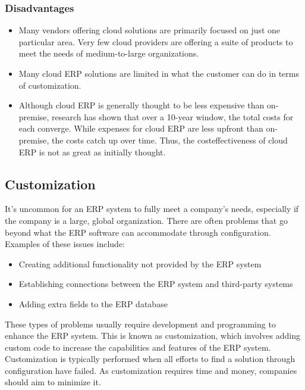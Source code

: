 \subsubsection{Disadvantages}
\begin{itemize}
    \item Many vendors offering cloud solutions are primarily focused on just one particular area. Very few cloud providers are offering a suite of products to meet the needs of medium-to-large organizations.
    \item Many cloud ERP solutions are limited in what the customer can do in terms of customization.
    \item Although cloud ERP is generally thought to be less expensive than on-premise, research has shown that over a 10-year window, the total costs for each converge. While expenses for cloud ERP are less upfront than on-premise, the costs catch up over time. Thus, the costeffectiveness of cloud ERP is not as great as initially thought.
\end{itemize}

\subsection{Customization}
It's uncommon for an ERP system to fully meet a company's needs, especially if the company is a large, global organization. There are often problems that go beyond what the ERP software can accommodate through configuration. Examples of these issues include:
\begin{itemize}
    \item Creating additional functionality not provided by the ERP system \item Establishing connections between the ERP system and third-party systems
    \item Adding extra fields to the ERP database
\end{itemize}
These types of problems usually require development and programming to enhance the ERP system. This is known as customization, which involves adding custom code to increase the capabilities and features of the ERP system. Customization is typically performed when all efforts to find a solution through configuration have failed. As customization requires time and money, companies should aim to minimize it.

